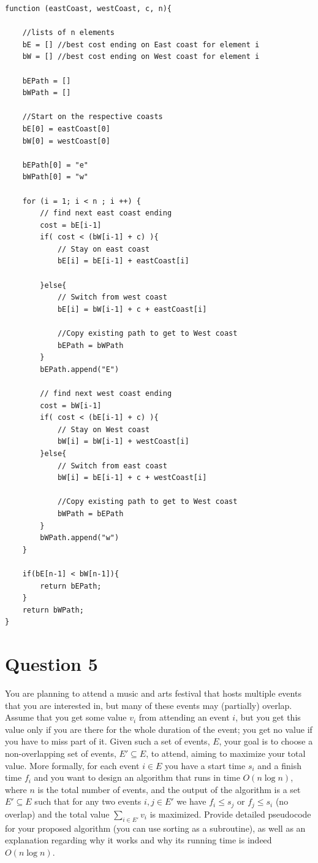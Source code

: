 \documentclass{article}
\begin{document}
\pagebreak
\begin{lstlisting}
function (eastCoast, westCoast, c, n){

    //lists of n elements
    bE = [] //best cost ending on East coast for element i
    bW = [] //best cost ending on West coast for element i

    bEPath = []
    bWPath = []

    //Start on the respective coasts
    bE[0] = eastCoast[0]
    bW[0] = westCoast[0]

    bEPath[0] = "e"
    bWPath[0] = "w"

    for (i = 1; i < n ; i ++) {
        // find next east coast ending
        cost = bE[i-1]
        if( cost < (bW[i-1] + c) ){
            // Stay on east coast
            bE[i] = bE[i-1] + eastCoast[i]

        }else{
            // Switch from west coast
            bE[i] = bW[i-1] + c + eastCoast[i]

            //Copy existing path to get to West coast
            bEPath = bWPath
        }
        bEPath.append("E")

        // find next west coast ending
        cost = bW[i-1]
        if( cost < (bE[i-1] + c) ){
            // Stay on West coast
            bW[i] = bW[i-1] + westCoast[i]
        }else{
            // Switch from east coast
            bW[i] = bE[i-1] + c + westCoast[i]

            //Copy existing path to get to West coast
            bWPath = bEPath
        }
        bWPath.append("w")
    }

    if(bE[n-1] < bW[n-1]){
        return bEPath;
    }
    return bWPath;
}

\end{lstlisting}




\section*{Question 5}
You are planning to attend a music and arts festival that hosts multiple events that
you are interested in, but many of these events may (partially) overlap. Assume that you get some value
$v_i$ from attending an event $i$, but you get this value only if you are there for the whole duration
of the event; you get no value if you have to miss part of it. Given such a set of events, $E$, your
goal is to choose a non-overlapping set of events, $E'\subseteq E$, to attend, aiming to maximize your
total value. More formally, for each event $i\in E$ you have a start time $s_i$ and a finish time $f_i$ and
you want to design an algorithm that runs in time $O(n\log n)$, where $n$ is the total number of events,
and the output of the algorithm is a set $E'\subseteq E$ such that for any two events $i,j\in E'$ we have
$f_i\leq s_j$ or $f_j \leq s_i$ (no overlap) and the total value $\sum_{i\in E'} v_i$ is maximized. Provide
detailed pseudocode for your proposed algorithm (you can use sorting as a subroutine), as well as an explanation
regarding why it works and why its running time is indeed $O(n\log n)$.
\newline
\newline
\end{document}
